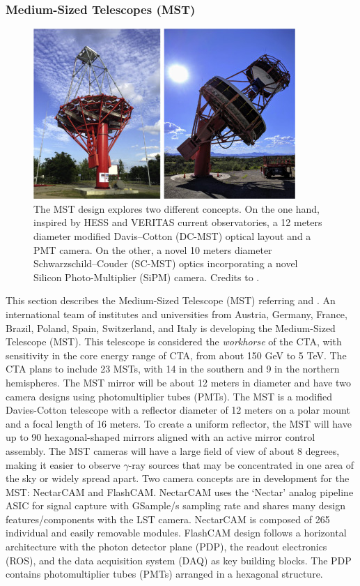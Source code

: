 \subsubsection{Medium-Sized Telescopes (MST)}
\begin{figure}[t]
\centering
\includegraphics[width=0.9\linewidth]{figures/introduction/mst.jpg}
\caption{The MST design explores two different concepts. On the one hand, inspired by HESS and VERITAS current observatories, a 12 meters diameter modified Davis–Cotton (DC-MST) optical layout and a PMT camera. On the other, a novel 10 meters diameter Schwarzschild–Couder (SC-MST) optics incorporating a novel Silicon Photo-Multiplier (SiPM) camera. Credits to \cite{Barrio_2020}.} 
\label{fig:mst}
\end{figure}
This section describes the Medium-Sized Telescope (MST) referring \cite{Barrio_2020} and \cite{ctaobservatorywebsitetechnology}.
An international team of institutes and universities from Austria, Germany, France, Brazil, Poland, Spain, Switzerland, and Italy is developing the Medium-Sized Telescope (MST). This telescope is considered the \textit{workhorse} of the CTA, with sensitivity in the core energy range of CTA, from about 150 GeV to 5 TeV. The CTA plans to include 23 MSTs, with 14 in the southern and 9 in the northern hemispheres. The MST mirror will be about 12 meters in diameter and have two camera designs using photomultiplier tubes (PMTs).
The MST is a modified Davies-Cotton telescope with a reflector diameter of 12 meters on a polar mount and a focal length of 16 meters. To create a uniform reflector, the MST will have up to 90 hexagonal-shaped mirrors aligned with an active mirror control assembly. The MST cameras will have a large field of view of about 8 degrees, making it easier to observe $\gamma$-ray sources that may be concentrated in one area of the sky or widely spread apart. Two camera concepts are in development for the MST: NectarCAM and FlashCAM. NectarCAM uses the ‘Nectar’ analog pipeline ASIC for signal capture with GSample/s sampling rate and shares many design features/components with the LST camera. NectarCAM is composed of 265 individual and easily removable modules. FlashCAM design follows a horizontal architecture with the photon detector plane (PDP), the readout electronics (ROS), and the data acquisition system (DAQ) as key building blocks. The PDP contains photomultiplier tubes (PMTs) arranged in a hexagonal structure.
